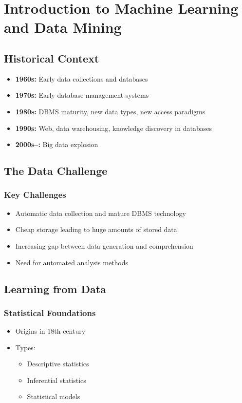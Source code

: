 \chapter{Introduction to Machine Learning and Data Mining}

\section{Historical Context}
\begin{itemize}
    \item \textbf{1960s:} Early data collections and databases
    \item \textbf{1970s:} Early database management systems
    \item \textbf{1980s:} DBMS maturity, new data types, new access paradigms
    \item \textbf{1990s:} Web, data warehousing, knowledge discovery in databases
    \item \textbf{2000s--:} Big data explosion
\end{itemize}

\section{The Data Challenge}

\subsection{Key Challenges}
\begin{itemize}
    \item Automatic data collection and mature DBMS technology
    \item Cheap storage leading to huge amounts of stored data
    \item Increasing gap between data generation and comprehension
    \item Need for automated analysis methods
\end{itemize}

\section{Learning from Data}

\subsection{Statistical Foundations}
\begin{itemize}
    \item Origins in 18th century
    \item Types:
    \begin{itemize}
        \item Descriptive statistics
        \item Inferential statistics
        \item Statistical models
    \end{itemize}
\end{itemize}

